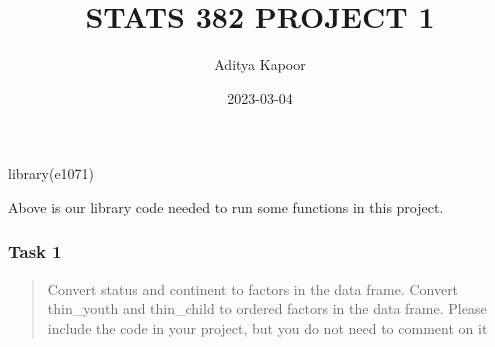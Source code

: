 \documentclass[
]{article}
\title{STATS 382 PROJECT 1}
\author{Aditya Kapoor}
\date{2023-03-04}
\newenvironment{Shaded}{\begin{snugshade}}{\end{snugshade}}
\newcommand{\AttributeTok}[1]{\textcolor[rgb]{0.77,0.63,0.00}{#1}}
\newcommand{\ConstantTok}[1]{\textcolor[rgb]{0.00,0.00,0.00}{#1}}
\newcommand{\FunctionTok}[1]{\textcolor[rgb]{0.00,0.00,0.00}{#1}}
\newcommand{\NormalTok}[1]{#1}
\newcommand{\OtherTok}[1]{\textcolor[rgb]{0.56,0.35,0.01}{#1}}
\newcommand{\SpecialCharTok}[1]{\textcolor[rgb]{0.00,0.00,0.00}{#1}}
\newcommand{\StringTok}[1]{\textcolor[rgb]{0.31,0.60,0.02}{#1}}
\begin{document}
\maketitle

\begin{Shaded}
\begin{Highlighting}[]
\FunctionTok{library}\NormalTok{(e1071)}
\end{Highlighting}
\end{Shaded}

Above is our library code needed to run some functions in this project.

\hypertarget{task-1}{%
\subsubsection{Task 1}\label{task-1}}

\begin{quote}
Convert status and continent to factors in the data frame. Convert
thin\_youth and thin\_child to ordered factors in the data frame. Please
include the code in your project, but you do not need to comment on it
\end{quote}

\begin{Shaded}
\end{Shaded}
\end{document}
